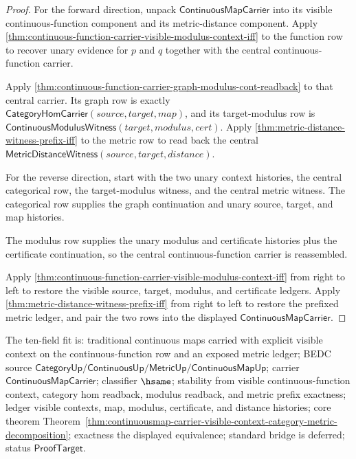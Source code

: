 \begin{proof}
For the forward direction, unpack $\mathsf{ContinuousMapCarrier}$ into its
visible continuous-function component and its metric-distance component. Apply
\autoref{thm:continuous-function-carrier-visible-modulus-context-iff} to the
function row to recover unary evidence for $p$ and $q$ together with the central
continuous-function carrier.

Apply
\autoref{thm:continuous-function-carrier-graph-modulus-cont-readback} to that
central carrier. Its graph row is exactly
$\mathsf{CategoryHomCarrier}(source,target,map)$, and its target-modulus row is
$\mathsf{ContinuousModulusWitness}(target,modulus,cert)$. Apply
\autoref{thm:metric-distance-witness-prefix-iff} to the metric row to read back
the central $\mathsf{MetricDistanceWitness}(source,target,distance)$.

For the reverse direction, start with the two unary context histories, the
central categorical row, the target-modulus witness, and the central metric
witness. The categorical row supplies the graph continuation and unary source,
target, and map histories.

The modulus row supplies the unary modulus and certificate histories plus the
certificate continuation, so the central continuous-function carrier is
reassembled.

Apply
\autoref{thm:continuous-function-carrier-visible-modulus-context-iff} from
right to left to restore the visible source, target, modulus, and certificate
ledgers. Apply \autoref{thm:metric-distance-witness-prefix-iff} from right to
left to restore the prefixed metric ledger, and pair the two rows into the
displayed $\mathsf{ContinuousMapCarrier}$.
\end{proof}

The ten-field fit is: traditional continuous maps carried with explicit visible
context on the continuous-function row and an exposed metric ledger; BEDC source
$\mathsf{CategoryUp}/\mathsf{ContinuousUp}/\mathsf{MetricUp}/
\mathsf{ContinuousMapUp}$; carrier $\mathsf{ContinuousMapCarrier}$; classifier
$\hsame$; stability from visible continuous-function context, category hom
readback, modulus readback, and metric prefix exactness; ledger visible
contexts, map, modulus, certificate, and distance histories; core theorem
Theorem~\ref{thm:continuousmap-carrier-visible-context-category-metric-decomposition};
exactness the displayed equivalence; standard bridge is deferred; status
$\mathsf{ProofTarget}$.

